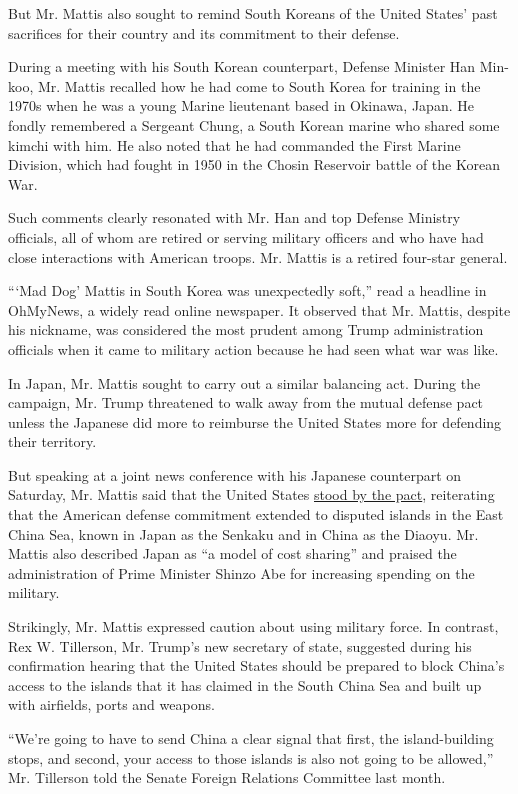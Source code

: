 But Mr. Mattis also sought to remind South Koreans of the United States'
past sacrifices for their country and its commitment to their defense.

During a meeting with his South Korean counterpart, Defense Minister Han
Min-koo, Mr. Mattis recalled how he had come to South Korea for training
in the 1970s when he was a young Marine lieutenant based in Okinawa,
Japan. He fondly remembered a Sergeant Chung, a South Korean marine who
shared some kimchi with him. He also noted that he had commanded the
First Marine Division, which had fought in 1950 in the Chosin Reservoir
battle of the Korean War.

Such comments clearly resonated with Mr. Han and top Defense Ministry
officials, all of whom are retired or serving military officers and who
have had close interactions with American troops. Mr. Mattis is a
retired four-star general.

```Mad Dog' Mattis in South Korea was unexpectedly soft,'' read a
headline in OhMyNews, a widely read online newspaper. It observed that
Mr. Mattis, despite his nickname, was considered the most prudent among
Trump administration officials when it came to military action because
he had seen what war was like.

In Japan, Mr. Mattis sought to carry out a similar balancing act. During
the campaign, Mr. Trump threatened to walk away from the mutual defense
pact unless the Japanese did more to reimburse the United States more
for defending their territory.

But speaking at a joint news conference with his Japanese counterpart on
Saturday, Mr. Mattis said that the United States
\href{https://www.nytimes3xbfgragh.onion/2017/02/03/world/asia/us-japan-mattis-abe-defense.html}{stood
by the pact}, reiterating that the American defense commitment extended
to disputed islands in the East China Sea, known in Japan as the Senkaku
and in China as the Diaoyu. Mr. Mattis also described Japan as ``a model
of cost sharing'' and praised the administration of Prime Minister
Shinzo Abe for increasing spending on the military.

Strikingly, Mr. Mattis expressed caution about using military force. In
contrast, Rex W. Tillerson, Mr. Trump's new secretary of state,
suggested during his confirmation hearing that the United States should
be prepared to block China's access to the islands that it has claimed
in the South China Sea and built up with airfields, ports and weapons.

``We're going to have to send China a clear signal that first, the
island-building stops, and second, your access to those islands is also
not going to be allowed,'' Mr. Tillerson told the Senate Foreign
Relations Committee last month.

